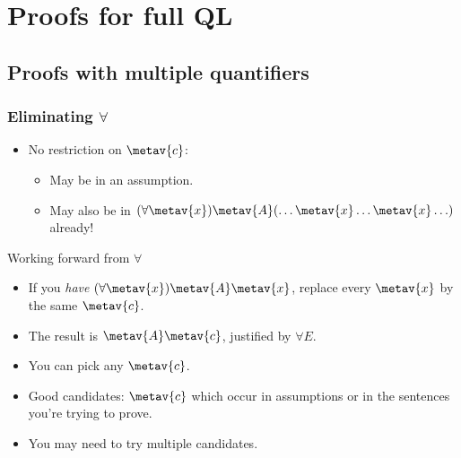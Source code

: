 ﻿%

\setcounter{section}{9}

\section{Proofs for full QL}

\subsection{Proofs with multiple quantifiers}

\begin{frame}
  \frametitle{Eliminating $\forall$}

  \begin{fitchproof}
     
  \end{fitchproof}
  \begin{itemize}
    \item No restriction on $\metav{c}$:
    \begin{itemize}[<+->]
      \item May be in an assumption.
      \item May also be in $\qt{\forall}{\metav{x}}\metav{A}(\ldots \metav{x}
      \ldots \metav{x}\ldots)$ already!
    \end{itemize}
  \end{itemize}
\end{frame}

\begin{frame}{Working forward from $\forall$}

  \begin{itemize}[<+->]
    \item If you \emph{have $\qt{\forall}{\metav{x}}\metav{A}\qv{\metav{x}}$}, replace every $\metav{x}$ by the
      same $\metav{c}$.
    \item The result is $\metav{A}\qv{\metav{c}}$, justified by $\forall E$.
    \item You can pick any $\metav{c}$.
    \item Good candidates: $\metav{c}$ which occur in assumptions or
      in the sentences you're trying to prove.
    \item You may need to try multiple candidates.
    \end{itemize}
\end{frame}

